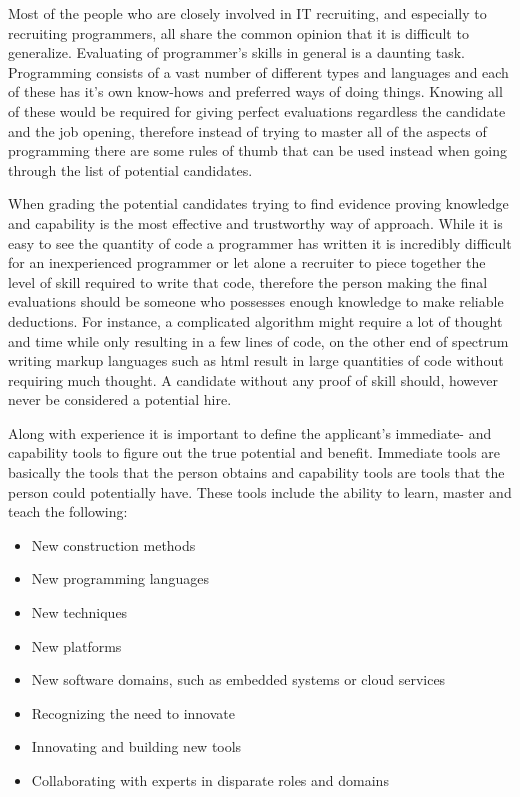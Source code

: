 \documentclass[11pt,a4paper,oneside,article]{memoir}
\begin{document}
Most of the people who are closely involved in IT recruiting, and especially to recruiting programmers, all share the common opinion that it is difficult to generalize. Evaluating of programmer's skills in general is a daunting task. Programming consists of a vast number of different types and languages and each of these has it's own know-hows and preferred ways of doing things. Knowing all of these would be required for giving perfect evaluations regardless the candidate and the job opening, therefore instead of trying to master all of the aspects of programming there are some rules of thumb that can be used instead when going through the list of potential candidates.

When grading the potential candidates trying to find evidence proving knowledge and capability is the most effective and trustworthy way of approach.\cite[p.~6-7]{mcculler:book} While it is easy to see the quantity of code a programmer has written it is incredibly difficult for an inexperienced programmer or let alone a recruiter to piece together the level of skill required to write that code, therefore the person making the final evaluations should be someone who possesses enough knowledge to make reliable deductions. For instance, a complicated algorithm might require a lot of thought and time while only resulting in a few lines of code, on the other end of spectrum writing markup languages such as \gls{html} result in large quantities of code without requiring much thought. A candidate without any proof of skill should, however never be considered a potential hire.

Along with experience it is important to define the applicant's immediate- and capability tools to figure out the true potential and benefit. Immediate tools are basically the tools that the person obtains and capability tools are tools that the person could potentially have. These tools include the ability to learn, master and teach the following:

\vspace{-17pt} 
\begin{itemize}
\item New construction methods
\item New programming languages
\item New techniques
\item New platforms
\item New software domains, such as embedded systems or cloud services
\item Recognizing the need to innovate
\item Innovating and building new tools
\item Collaborating with experts in disparate roles and domains \cite[p.~10]{mcculler:book}
\end{itemize}
\vspace{-17pt}
\end{document}
